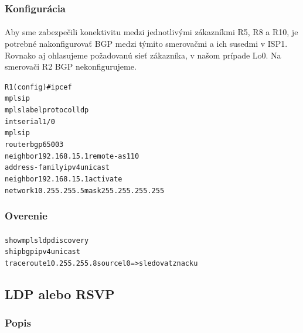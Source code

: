 \documentclass[12pt,twoside,a4paper]{report}
\begin{document}
\subsubsection{Konfigurácia}
\paragraph{}
Aby sme zabezpečili konektivitu medzi jednotlivými zákazníkmi R5, R8 a R10, je potrebné nakonfigurovať BGP medzi týmito smerovačmi a ich susedmi v ISP1. Rovnako aj ohlasujeme požadovanú sieť zákazníka, v našom prípade Lo0. Na smerovači R2 BGP nekonfigurujeme.

\noindent
{\selectfont
\begin{small}
\begin{alltt}
R1 (config)#ip cef
mpls ip
mpls label protocol ldp
int serial1/0
  mpls ip
router bgp 65003
  neighbor 192.168.15.1 remote-as 110
  address-family ipv4 unicast
  neighbor 192.168.15.1 activate
  network 10.255.255.5 mask 255.255.255.255
\end{alltt}
\end{small}
}

\subsubsection{Overenie}
\paragraph{}
\noindent
{\selectfont
\begin{small}
\begin{alltt}
show mpls ldp discovery
sh ip bgp ipv4 unicast
traceroute 10.255.255.8 source l0 =\textgreater sledovat znacku
\end{alltt}
\end{small}
}






\subsection{LDP alebo RSVP}
\subsubsection{Popis}
\paragraph{}
\end{document}
